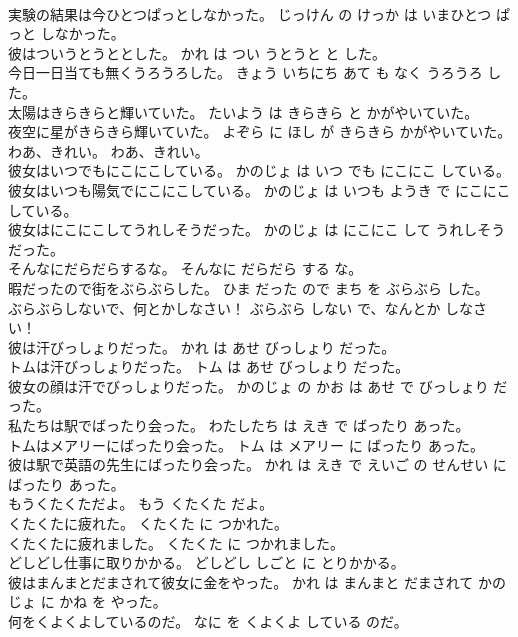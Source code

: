 \documentclass[8pt]{extreport}
\begin{document}
\begin{CJK}{UTF8}{min}
\\	実験の結果は今ひとつぱっとしなかった。	じっけん の けっか は いまひとつ ぱっと しなかった。	
\\	彼はついうとうととした。	かれ は つい うとうと と した。	
\\	今日一日当ても無くうろうろした。	きょう いちにち あて も なく うろうろ した。	
\\	太陽はきらきらと輝いていた。	たいよう は きらきら と かがやいていた。	
\\	夜空に星がきらきら輝いていた。	よぞら に ほし が きらきら かがやいていた。	
\\	わあ、きれい。	わあ、きれい。	
\\	彼女はいつでもにこにこしている。	かのじょ は いつ でも にこにこ している。	
\\	彼女はいつも陽気でにこにこしている。	かのじょ は いつも ようき で にこにこ している。	
\\	彼女はにこにこしてうれしそうだった。	かのじょ は にこにこ して うれしそう だった。	
\\	そんなにだらだらするな。	そんなに だらだら する な。	
\\	暇だったので街をぶらぶらした。	ひま だった ので まち を ぶらぶら した。	
\\	ぶらぶらしないで、何とかしなさい！	ぶらぶら しない で、なんとか しなさい！	
\\	彼は汗びっしょりだった。	かれ は あせ びっしょり だった。	
\\	トムは汗びっしょりだった。	トム は あせ びっしょり だった。	
\\	彼女の顔は汗でびっしょりだった。	かのじょ の かお は あせ で びっしょり だった。	
\\	私たちは駅でばったり会った。	わたしたち は えき で ばったり あった。	
\\	トムはメアリーにばったり会った。	トム は メアリー に ばったり あった。	
\\	彼は駅で英語の先生にばったり会った。	かれ は えき で えいご の せんせい に ばったり あった。	
\\	もうくたくただよ。	もう くたくた だよ。	
\\	くたくたに疲れた。	くたくた に つかれた。	
\\	くたくたに疲れました。	くたくた に つかれました。	
\\	どしどし仕事に取りかかる。	どしどし しごと に とりかかる。	
\\	彼はまんまとだまされて彼女に金をやった。	かれ は まんまと だまされて かのじょ に かね を やった。	
\\	何をくよくよしているのだ。	なに を くよくよ している のだ。	

\end{CJK}
\end{document}
